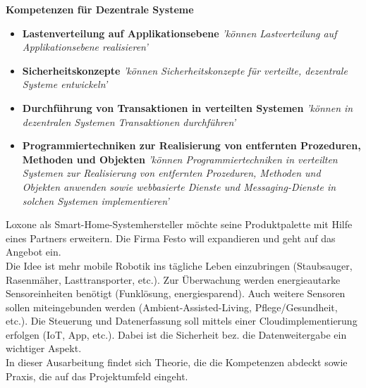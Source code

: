 \documentclass[letterpaper, 12pt]{article}
\begin{document}
\parindent 0pt
\parskip 6pt



\clearpage
\thispagestyle{empty}
\tableofcontents

\newpage
{}
\pagestyle{fancy}

\textbf{Kompetenzen für Dezentrale Systeme}

\begin{itemize}
	\item	\textbf{Lastenverteilung auf Applikationsebene} \newline
	\textit{'können Lastverteilung auf Applikationsebene realisieren'}
	\item 	\textbf{Sicherheitskonzepte} \newline
	\textit{'können Sicherheitskonzepte für verteilte, dezentrale Systeme entwickeln'}
	\item 	\textbf{Durchführung von Transaktionen in verteilten Systemen} \newline
	\textit{'können in dezentralen Systemen Transaktionen durchführen'}
	\item	\textbf{Programmiertechniken zur Realisierung von entfernten Prozeduren, Methoden und Objekten} \newline
	\textit{'können Programmiertechniken in verteilten Systemen zur Realisierung von entfernten Prozeduren, Methoden und Objekten anwenden sowie webbasierte Dienste und Messaging-Dienste in solchen Systemen implementieren'}
\end{itemize}


Loxone als Smart-Home-Systemhersteller möchte seine Produktpalette mit
Hilfe eines Partners erweitern. Die Firma Festo will expandieren und
geht auf das Angebot ein. \\
Die Idee ist mehr mobile Robotik ins tägliche Leben einzubringen
(Staubsauger, Rasenmäher, Lasttransporter, etc.). Zur Überwachung werden
energieautarke Sensoreinheiten benötigt (Funklösung, energiesparend).
Auch weitere Sensoren sollen miteingebunden werden
(Ambient-Assisted-Living, Pflege/Gesundheit, etc.).
Die Steuerung und Datenerfassung soll mittels einer Cloudimplementierung
erfolgen (IoT, App, etc.).
Dabei ist die Sicherheit bez. die Datenweitergabe ein wichtiger Aspekt. \\

In dieser Ausarbeitung findet sich Theorie, die die Kompetenzen abdeckt sowie Praxis, die auf das Projektumfeld eingeht.
\end{document}
